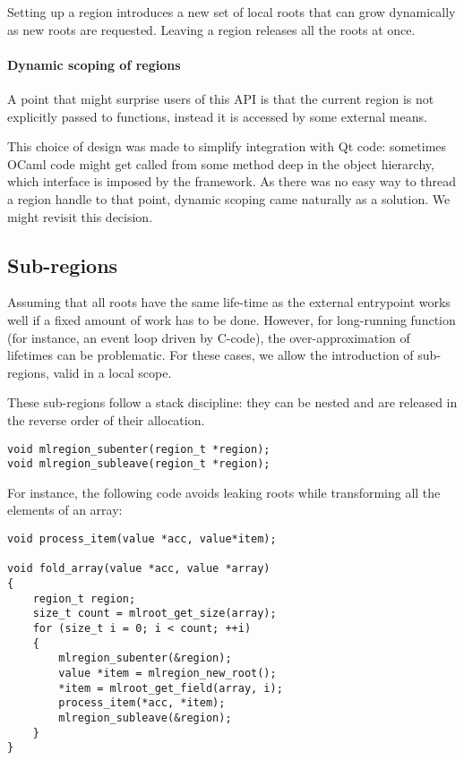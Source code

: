 \documentclass[a4paper]{easychair}
\begin{document}
Setting up a region introduces a new set of local roots that can grow
dynamically as new roots are requested. Leaving a region releases all
the roots at once.

\paragraph{Dynamic scoping of regions} A point that might surprise users of
this API is that the current region is not explicitly passed to functions,
instead it is accessed by some external means.

This choice of design was made to simplify integration with Qt code: sometimes
OCaml code might get called from some method deep in the object hierarchy,
which interface is imposed by the framework.  As there was no easy way to
thread a region handle to that point, dynamic scoping came naturally as a
solution. We might revisit this decision.

\subsection{Sub-regions}

Assuming that all roots have the same life-time as the external
entrypoint works well if a fixed amount of work has to be done. However,
for long-running function (for instance, an event loop driven by
C-code), the over-approximation of lifetimes can be problematic. For
these cases, we allow the introduction of sub-regions, valid in a local
scope.

These sub-regions follow a stack discipline: they can be nested and are
released in the reverse order of their allocation.
%
\begin{lstlisting}[style=C++]
void mlregion_subenter(region_t *region);
void mlregion_subleave(region_t *region);
\end{lstlisting}

For instance, the following code avoids leaking roots while transforming
all the elements of an array:
%
\begin{lstlisting}[style=C++]
void process_item(value *acc, value*item);

void fold_array(value *acc, value *array)
{
    region_t region;
    size_t count = mlroot_get_size(array);
    for (size_t i = 0; i < count; ++i)
    {
        mlregion_subenter(&region);
        value *item = mlregion_new_root();
        *item = mlroot_get_field(array, i);
        process_item(*acc, *item);
        mlregion_subleave(&region);
    }
}
\end{lstlisting}
\end{document}
